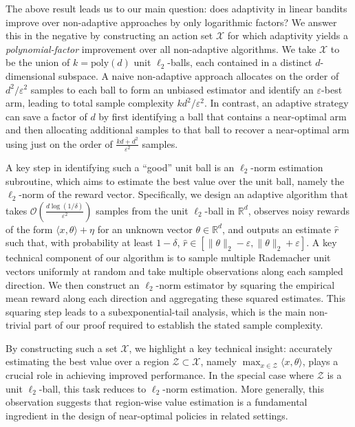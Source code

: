The above result leads us to our main question: does adaptivity in linear bandits improve over non-adaptive approaches by only logarithmic factors? We answer this in the negative by constructing an action set $\mathcal{X}$ for which adaptivity yields a {\it polynomial-factor} improvement over all non-adaptive algorithms. We take $\mathcal{X}$ to be the union of $k=\mathrm{poly}(d)$ unit $\ell_2$-balls, each contained in a distinct $d$-dimensional subspace. A naive non-adaptive approach allocates on the order of $d^2/\varepsilon^2$ samples to each ball to form an unbiased estimator and identify an $\varepsilon$-best arm, leading to total sample complexity $kd^2/\varepsilon^2$. In contrast, an adaptive strategy can save a factor of $d$ by first identifying a ball that contains a near-optimal arm and then allocating additional samples to that ball to recover a near-optimal arm using just on the order of $\frac{kd + d^2}{\varepsilon^2}$ samples.


A key step in identifying such a “good” unit ball is an $\ell_2$-norm estimation subroutine, which aims to estimate the best value over the unit ball, namely the $\ell_2$-norm of the reward vector. Specifically, we design an adaptive algorithm that takes $\mathcal{O}\!\left(\frac{d\log(1/\delta)}{\varepsilon^2}\right)$ samples from the unit $\ell_2$-ball in $\mathbb{R}^d$, observes noisy rewards of the form $\langle x,\theta\rangle+\eta$ for an unknown vector $\theta\in\mathbb{R}^d$, and outputs an estimate $\widehat r$ such that, with probability at least $1-\delta$, $\widehat r\in[\|\theta\|_2-\varepsilon,\|\theta\|_2+\varepsilon]$. A key technical component of our algorithm is to sample multiple Rademacher unit vectors uniformly at random and take multiple observations along each sampled direction. We then construct an $\ell_2$-norm estimator by squaring the empirical mean reward along each direction and aggregating these squared estimates. This squaring step leads to a subexponential-tail analysis, which is the main non-trivial part of our proof required to establish the stated sample complexity. 

By constructing such a set $\mathcal{X}$, we highlight a key technical insight: accurately estimating the best value over a region $\mathcal{Z}\subset\mathcal{X}$, namely $\max_{x\in\mathcal{Z}}\langle x,\theta\rangle$, plays a crucial role in achieving improved performance. In the special case where $\mathcal{Z}$ is a unit $\ell_2$-ball, this task reduces to $\ell_2$-norm estimation. More generally, this observation suggests that region-wise value estimation is a fundamental ingredient in the design of near-optimal policies in related settings.

